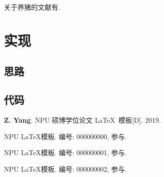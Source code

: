 \documentclass[twoside, UTF8, phd]{nputhesis}
\theoremstyle{npuplain}
\theoremstyle{nputheorem}
\begin{document}
关于养猪的文献有\parencite{Zhang2019, Zhang2019a, Zhang2019b, Zhang2019c}.

\chapter{实现}
\section{思路}
\section{代码}

\backmatter
\printbibliography             %

\Appendix  %

\Thanks     %

\Work
\papersection  %

\begin{npulist}
  \item {\bf Z. Yang}. NPU 硕博学位论文 \LaTeX\ 模板[D]. 2019.
\end{npulist}

\researchsection %
\begin{npulist}
  \item NPU \LaTeX 模板.   编号: 000000000, 参与.
  \item NPU \LaTeX 模板.   编号: 000000001, 参与.
  \item NPU \LaTeX 模板.   编号: 000000002, 参与.
\end{npulist}

\statement
\end{document}

